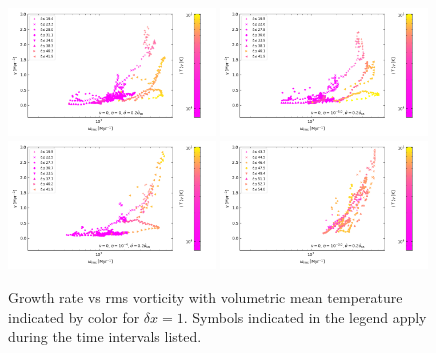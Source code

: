 \documentclass[preprint2]{aastex63}
\newcommand\dx{ {\delta x}}
\begin{document}
\begin{figure}
\centering
\includegraphics[trim=0.2cm 1.4cm 0.5cm 0.2cm,clip=true,width=0.49\textwidth]{csc_figs/gvw-1pcPm0e-00.png}
\includegraphics[trim=0.2cm 1.4cm 0.5cm 0.2cm,clip=true,width=0.49\textwidth]{csc_figs/gvw-1pcPm0e-50.png}
\includegraphics[trim=0.2cm 0.2cm 0.5cm 0.2cm,clip=true,width=0.49\textwidth]{csc_figs/gvw-1pcPm0e-40.png}
\includegraphics[trim=0.2cm 0.2cm 0.5cm 0.2cm,clip=true,width=0.49\textwidth]{csc_figs/gvw-1pcPm0e-30.png}
\caption{
Growth rate vs rms vorticity with volumetric mean temperature indicated by 
color for $\dx=1$.
Symbols indicated in the legend apply during the time intervals listed.
\label{fig:lsd-power}
}
\end{figure}
\end{document}
